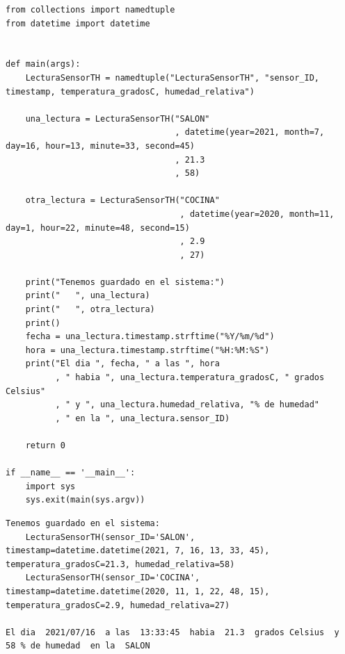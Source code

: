 \documentclass[spanish,12pt,a4paper,final,oneside]{book}
\begin{document}
\begin{lstlisting}[frame=single, caption=lenguaje Python]
from collections import namedtuple
from datetime import datetime


def main(args):
    LecturaSensorTH = namedtuple("LecturaSensorTH", "sensor_ID, timestamp, temperatura_gradosC, humedad_relativa")
    
    una_lectura = LecturaSensorTH("SALON"
                                  , datetime(year=2021, month=7, day=16, hour=13, minute=33, second=45)
                                  , 21.3
                                  , 58)
                              
    otra_lectura = LecturaSensorTH("COCINA"
                                   , datetime(year=2020, month=11, day=1, hour=22, minute=48, second=15)
                                   , 2.9
                                   , 27)
                              
    print("Tenemos guardado en el sistema:")
    print("   ", una_lectura)
    print("   ", otra_lectura) 
    print()
    fecha = una_lectura.timestamp.strftime("%Y/%m/%d")
    hora = una_lectura.timestamp.strftime("%H:%M:%S")
    print("El dia ", fecha, " a las ", hora 
          , " habia ", una_lectura.temperatura_gradosC, " grados Celsius"
          , " y ", una_lectura.humedad_relativa, "% de humedad"
          , " en la ", una_lectura.sensor_ID)  
    
    return 0

if __name__ == '__main__':
    import sys
    sys.exit(main(sys.argv))
\end{lstlisting}

\begin{lstlisting}[frame=single]
Tenemos guardado en el sistema:
    LecturaSensorTH(sensor_ID='SALON', timestamp=datetime.datetime(2021, 7, 16, 13, 33, 45), temperatura_gradosC=21.3, humedad_relativa=58)
    LecturaSensorTH(sensor_ID='COCINA', timestamp=datetime.datetime(2020, 11, 1, 22, 48, 15), temperatura_gradosC=2.9, humedad_relativa=27)

El dia  2021/07/16  a las  13:33:45  habia  21.3  grados Celsius  y  58 % de humedad  en la  SALON
\end{lstlisting}
\end{document}
